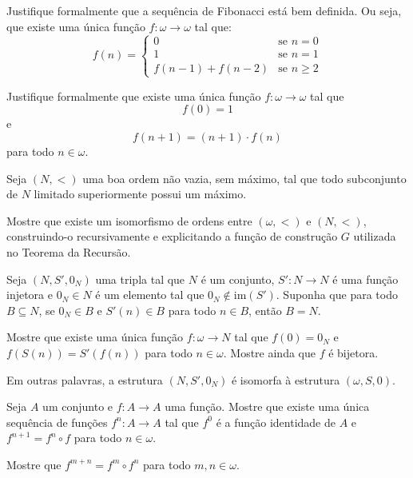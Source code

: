 \begin{exercise}
    Justifique formalmente que a sequência de Fibonacci está bem definida.
    Ou seja, que existe uma única função $f:\omega\to \omega$ tal que:
    \[
        f(n)=\begin{cases}
            0 & \text{se } n=0\\
            1 & \text{se } n=1\\
            f(n-1)+f(n-2) & \text{se } n\geq 2
        \end{cases}
    \] 
\end{exercise}

\begin{exercise}
    Justifique formalmente que existe uma única função $f:\omega\to\omega$ tal que
    \[
        f(0)=1
    \]
    e
    \[
        f(n+1)=(n+1)\cdot f(n)
    \]
    para todo $n\in\omega$.
\end{exercise}

\begin{exercise}
    Seja $(N, <)$ uma boa ordem não vazia, sem máximo, tal que todo subconjunto de $N$ limitado superiormente possui um máximo.

    Mostre que existe um isomorfismo de ordens entre $(\omega, <)$ e $(N, <)$, construindo-o recursivamente e explicitando a função de construção $G$ utilizada no Teorema da Recursão.
\end{exercise}

\begin{exercise}
    Seja $(N, S', 0_N)$ uma tripla tal que $N$ é um conjunto, $S':N\to N$ é uma função injetora e $0_N\in N$ é um elemento tal que $0_N\notin \mathrm{im}(S')$.
    Suponha que para todo $B\subseteq N$, se $0_N\in B$ e $S'(n)\in B$ para todo $n \in B$, então $B=N$.

    Mostre que existe uma única função $f:\omega\to N$ tal que $f(0)=0_N$ e
    $f(S(n))=S'(f(n))$ para todo $n\in\omega$.
    Mostre ainda que $f$ é bijetora.

    Em outras palavras, a estrutura $(N, S', 0_N)$ é isomorfa à estrutura $(\omega, S, 0)$.
\end{exercise}

\begin{exercise}\label{exr:composicaoDeIteradas}
    Seja $A$ um conjunto e $f:A\to A$ uma função.
    Mostre que existe uma única sequência de funções $f^n:A\to A$ tal que $f^0$ é a função identidade de $A$ e $f^{n+1}=f^n\circ f$ para todo $n\in\omega$.

    Mostre que $f^{m+n}=f^m\circ f^n$ para todo $m, n \in \omega$.
\end{exercise}
